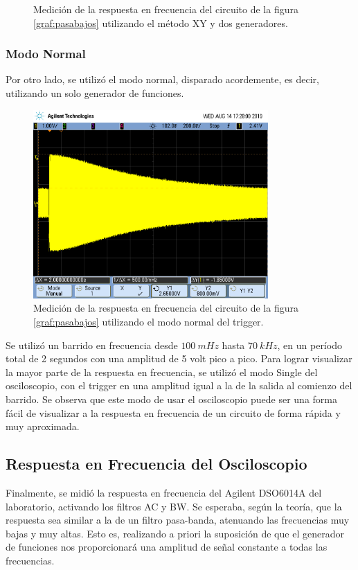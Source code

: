 \documentclass[a4paper]{article}
\begin{document}
\begin{figure}[H]
	\centering
	\caption{Medición de la respuesta en frecuencia del circuito de la figura \ref{graf:pasabajos} utilizando el método XY y dos generadores.} 
	\label{graf:osci_freq_alta}
\end{figure}

\subsubsection*{Modo Normal}
Por otro lado, se utilizó el modo normal, disparado acordemente, es decir, utilizando un solo generador de funciones.
\begin{figure}[H]
	\centering
	\includegraphics[width=0.8\textwidth,trim={0.5cm 2cm  0.5 5cm},clip]{ej3normal.png}
	\caption{Medición de la respuesta en frecuencia del circuito de la figura \ref{graf:pasabajos} utilizando el modo normal del trigger.} 
	\label{graf:ej3modonormal}
\end{figure}
Se utilizó un barrido en frecuencia desde $100 \ mHz$ hasta $70 \ kHz$, en un período total de 2 segundos con una amplitud de 5 volt pico a pico. Para lograr visualizar la mayor parte de la respuesta en frecuencia, se utilizó el modo Single del osciloscopio, con el trigger en una amplitud igual a la de la salida al comienzo del barrido. Se observa que este modo de usar el osciloscopio puede ser una forma fácil de visualizar a la respuesta en frecuencia de un circuito de forma rápida y muy aproximada.

\subsection*{Respuesta en Frecuencia del Osciloscopio}
Finalmente, se midió la respuesta en frecuencia del Agilent DSO6014A del laboratorio, activando los filtros AC y BW. Se esperaba, según la teoría, que la respuesta sea similar a la de un filtro pasa-banda, atenuando las frecuencias muy bajas y muy altas. Esto es, realizando a priori la suposición de que el generador de funciones nos proporcionará una amplitud de señal constante a todas las frecuencias.
\end{document}
